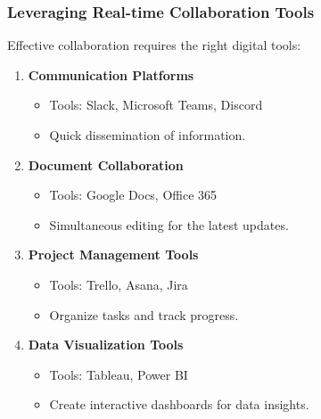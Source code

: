 \documentclass[aspectratio=169]{beamer}
\begin{document}
\begin{frame}[fragile]
    \frametitle{Leveraging Real-time Collaboration Tools}
    Effective collaboration requires the right digital tools:
    
    \begin{enumerate}
        \item \textbf{Communication Platforms}
        \begin{itemize}
            \item Tools: Slack, Microsoft Teams, Discord 
            \item Quick dissemination of information.
        \end{itemize}
        
        \item \textbf{Document Collaboration}
        \begin{itemize}
            \item Tools: Google Docs, Office 365
            \item Simultaneous editing for the latest updates.
        \end{itemize}
        
        \item \textbf{Project Management Tools}
        \begin{itemize}
            \item Tools: Trello, Asana, Jira
            \item Organize tasks and track progress.
        \end{itemize}
        
        \item \textbf{Data Visualization Tools}
        \begin{itemize}
            \item Tools: Tableau, Power BI
            \item Create interactive dashboards for data insights.
        \end{itemize}
    \end{enumerate}
\end{frame}
\end{document}
